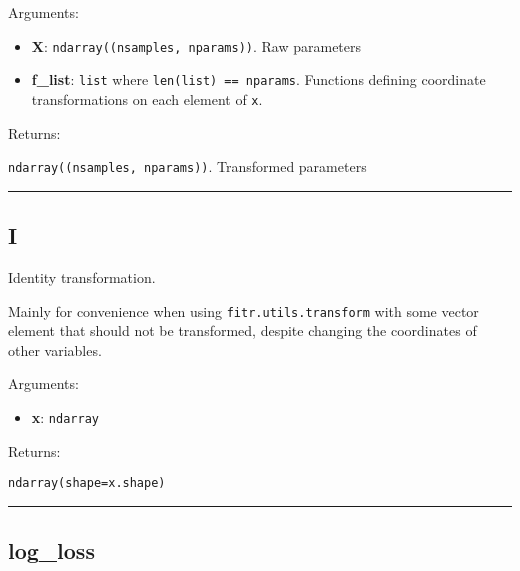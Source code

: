 Arguments:

\begin{itemize}
\tightlist
\item
  \textbf{X}: \texttt{ndarray((nsamples,\ nparams))}. Raw parameters
\item
  \textbf{f\_list}: \texttt{list} where \texttt{len(list)\ ==\ nparams}.
  Functions defining coordinate transformations on each element of
  \texttt{x}.
\end{itemize}

Returns:

\texttt{ndarray((nsamples,\ nparams))}. Transformed parameters

\begin{center}\rule{0.5\linewidth}{\linethickness}\end{center}

\subsection{I}\label{i}

\begin{Shaded}
\begin{Highlighting}[]
\end{Highlighting}
\end{Shaded}

Identity transformation.

Mainly for convenience when using \texttt{fitr.utils.transform} with
some vector element that should not be transformed, despite changing the
coordinates of other variables.

Arguments:

\begin{itemize}
\tightlist
\item
  \textbf{x}: \texttt{ndarray}
\end{itemize}

Returns:

\texttt{ndarray(shape=x.shape)}

\begin{center}\rule{0.5\linewidth}{\linethickness}\end{center}

\subsection{log\_loss}\label{log_loss}

\begin{Shaded}
\begin{Highlighting}[]
\end{Highlighting}
\end{Shaded}

